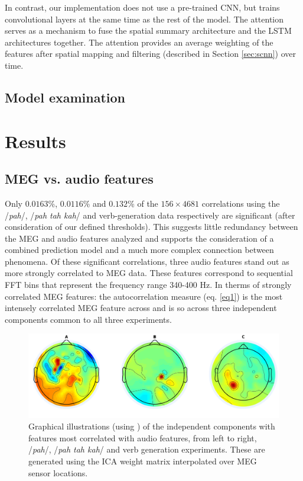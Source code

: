 \documentclass[utf8]{frontiersSCNS} %
\begin{document}
In contrast, our implementation does not use a pre-trained CNN, but trains convolutional layers at the same time as the rest of the model. The attention serves as a mechanism to fuse the spatial summary architecture and the LSTM architectures together. The attention provides an average weighting of the features after spatial mapping and filtering (described in Section \ref{sec:scnn}) over time.

\subsection{Model examination}



\section{Results}

\subsection{MEG vs. audio features}

Only $0.0163$\%, $0.0116$\% and $0.132$\% of the $156 \times 4681$ correlations using the /{\em pah}/, /{\em pah tah kah}/ and verb-generation data respectively are significant (after consideration of our defined thresholds). This suggests little redundancy between the MEG and audio features analyzed and supports the consideration of a combined prediction model and a much more complex connection between phenomena. Of these significant correlations, three audio features stand out as more strongly correlated to MEG data. These features correspond to sequential FFT bins that represent the frequency range 340-400 Hz. In therms of strongly correlated MEG features: the autocorrelation measure (eq. \ref{eq1}) is the most intensely correlated MEG feature across and is so across three independent components common to all three experiments.

\begin{figure}[t]
  \centering
  \includegraphics[width=\linewidth]{AllComponents.png}
  \caption{Graphical illustrations (using \cite{Delorme04eeglab}) of the independent components with features most correlated with audio features, from left to right, /{\em pah}/, /{\em pah tah kah}/ and verb generation experiments. These are generated using the ICA weight matrix interpolated over MEG sensor locations. }
  \label{fig:components}
\end{figure}
 
\end{document}
